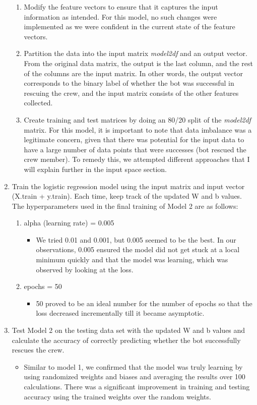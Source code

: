 \documentclass[11pt]{article}
\begin{document}
\begin{enumerate}
\begin{enumerate}
        \item Modify the feature vectors to ensure that it captures the input information as intended. For this model, no such changes were implemented as we were confident in the current state of the feature vectors.
        \item Partition the data into the input matrix \textit{model2df} and an output vector. From the original data matrix, the output is the last column, and the rest of the columns are the input matrix. In other words, the output vector corresponds to the binary label of whether the bot was successful in rescuing the crew, and the input matrix consists of the other features collected. 
        \item Create training and test matrices by doing an 80/20 split of the \textit{model2df} matrix. For this model, it is important to note that data imbalance was a legitimate concern, given that there was potential for the input data to have a large number of data points that were successes (bot rescued the crew member). To remedy this, we attempted different approaches that I will explain further in the input space section. 
        \end{enumerate}
        \item Train the logistic regression model using the input matrix and input vector (X.train + y.train). Each time, keep track of the updated W and b values. The hyperparameters used in the final training of Model 2 are as follows: 
        \begin{enumerate}
            \item alpha (learning rate) = 0.005
            \begin{itemize}
                \item We tried 0.01 and 0.001, but 0.005 seemed to be the best. In our observations, 0.005 ensured the model did not get stuck at a local minimum quickly and that the model was learning, which was observed by looking at the loss. 
            \end{itemize}
            \item epochs = 50
            \begin{itemize}
                \item 50 proved to be an ideal number for the number of epochs so that the loss decreased incrementally till it became asymptotic. 
            \end{itemize}
        \end{enumerate}
        \item Test Model 2 on the testing data set with the updated W and b values and calculate the accuracy of correctly predicting whether the bot successfully rescues the crew. 
        \begin{itemize}
        \item Similar to model 1, we confirmed that the model was truly learning by using randomized weights and biases and averaging the results over 100 calculations. There was a significant improvement in training and testing accuracy using the trained weights over the random weights.  
        \end{itemize}
    
\end{enumerate}
\end{document}
